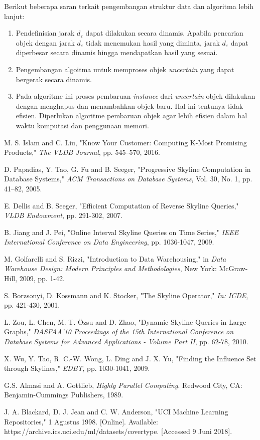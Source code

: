 \documentclass[conference]{IEEEtran}
\begin{document}
Berikut beberapa saran terkait pengembangan struktur data dan algoritma lebih lanjut:

\begin{enumerate}
	\item Pendefinisian jarak $ d_\varepsilon $ dapat dilakukan secara dinamis. Apabila pencarian objek dengan jarak $ d_\varepsilon $ tidak menemukan hasil yang diminta, jarak $ d_\varepsilon $ dapat diperbesar secara dinamis hingga mendapatkan hasil yang sesuai.
	\item Pengembangan algoitma untuk memproses objek \textit{uncertain} yang dapat bergerak secara dinamis.
	\item Pada algoritme ini proses pembaruan \textit{instance} dari \textit{uncertain} objek dilakukan dengan menghapus dan menambahkan objek baru. Hal ini tentunya tidak efisien. Diperlukan algoritme pembaruan objek agar lebih efisien dalam hal waktu komputasi dan penggunaan memori.
\end{enumerate}

\begin{thebibliography}{00}

M. S. Islam and C. Liu, "Know Your Customer: Computing K-Most Promising Products," \textit{The VLDB Journal}, pp. 545–570, 2016.

D. Papadias, Y. Tao, G. Fu and B. Seeger, "Progressive Skyline Computation in Database Systems," \textit{ACM Transactions on Database Systems}, Vol. 30, No. 1, pp. 41–82, 2005.

E. Dellis and B. Seeger, "Efficient Computation of Reverse Skyline Queries," \textit{VLDB Endowment}, pp. 291-302, 2007.

B. Jiang and J. Pei, "Online Interval Skyline Queries on Time Series," \textit{IEEE International Conference on Data Engineering}, pp. 1036-1047, 2009.

M. Golfarelli and S. Rizzi, "Introduction to Data Warehousing," in \textit{Data Warehouse Design: Modern Principles and Methodologies}, New York: McGraw-Hill, 2009, pp. 1-42. 

S. Borzsonyi, D. Kossmann and K. Stocker, "The Skyline Operator," \textit{In: ICDE}, pp. 421-430, 2001.

L. Zou, L. Chen, M. T. Özsu and D. Zhao, "Dynamic Skyline Queries in Large Graphs," \textit{DASFAA'10 Proceedings of the 15th International Conference on Database Systems for Advanced Applications - Volume Part II}, pp. 62-78, 2010.

X. Wu, Y. Tao, R. C.-W. Wong, L. Ding and J. X. Yu, "Finding the Influence Set through Skylines," \textit{EDBT}, pp. 1030-1041, 2009.

G.S. Almasi and A. Gottlieb, \textit{Highly Parallel Computing}. Redwood City, CA: Benjamin-Cummings Publishers, 1989.

J. A. Blackard, D. J. Jean and C. W. Anderson, "UCI
Machine Learning Repositories," 1 Agustus 1998. [Online].
Available: https://archive.ics.uci.edu/ml/datasets/covertype.
[Accessed 9 Juni 2018].

\end{thebibliography}
\end{document}

